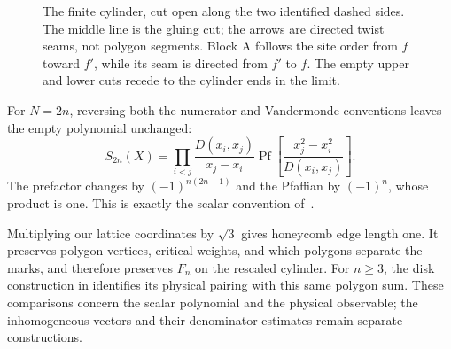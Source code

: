 \begin{figure}[tb]
\centering
{}
\caption{The finite cylinder, cut open along the two identified dashed
sides. The middle line is the gluing cut; the arrows are directed twist
seams, not polygon segments. Block A follows the site order from $f$
toward $f'$, while its seam is directed from $f'$ to $f$. The empty
upper and lower cuts recede to the cylinder ends in the limit.}
\label{fig:pv:seams}
\end{figure}

\begin{remark}\label{rem:pv:scalar-comparison}
For $N=2n$, reversing both the numerator and Vandermonde conventions
leaves the empty polynomial unchanged:
\[
 S_{2n}(X)=\prod_{i<j}\frac{D(x_i,x_j)}{x_j-x_i}
 \operatorname{Pf}\!\left[\frac{x_j^2-x_i^2}{D(x_i,x_j)}\right].
\]
The prefactor changes by $(-1)^{n(2n-1)}$ and the Pfaffian by
$(-1)^n$, whose product is one. This is exactly the scalar convention
of~\cite[Section~5.2]{DiskTransfer2026}.

Multiplying our lattice coordinates by $\sqrt3$ gives honeycomb edge
length one. It preserves polygon vertices, critical weights, and which
polygons separate the marks, and therefore preserves $F_n$ on the
rescaled cylinder.
For $n\ge3$, the disk construction in
\cite[Section~5.3]{DiskTransfer2026} identifies its physical pairing
with this same polygon sum. These comparisons concern the scalar
polynomial and the physical observable; the inhomogeneous vectors and
their denominator estimates remain separate constructions.
\end{remark}

